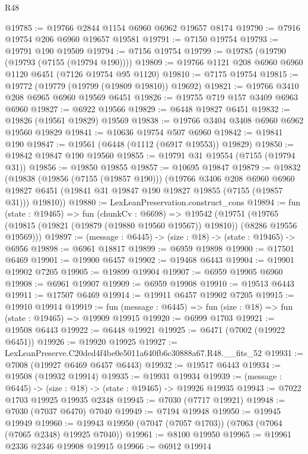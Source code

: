 \begin{lexlean}{R48}
\begin{coremodule}
@19785 := @19766 @2844 @1154 @6960 @6962 @19657 @8174
@19790 := @7916 @19754 @206 @6960 @19657 @19581
@19791 := @7150 @19754
@19793 := @19791 @190 @19509
@19794 := @7156 @19754
@19799 := @19785 (@19790 (@19793 (@7155 (@19794 @190))))
@19809 := @19766 @1121 @208 @6960 @6960 @1120 @6451 (@7126 @19754 @95 @1120)
@19810 := @7175 @19754
@19815 := @19772 (@19779 (@19799 (@19809 @19810)) @19692)
@19821 := @19766 @3410 @208 @6965 @6960 @19569 @6451
@19826 := @19755 @719 @157 @3409 @6963 @6960
@19827 := @6922 @19566
@19829 := @6448 @19827 @6451
@19832 := @19826 (@19561 @19829) @19569
@19838 := @19766 @3404 @3408 @6960 @6962 @19560 @19829
@19841 := @10636 @19754 @507 @6960
@19842 := @19841 @190
@19847 := @19561 (@6448 (@1112 (@6917 @19553)) @19829)
@19850 := @19842 @19847 @190 @19560
@19855 := @19791 @31 @19554 (@7155 (@19794 @31))
@19856 := @19850 @19855
@19857 := @10695 @19847
@19879 := @19832
    (@19838
      (@19856 (@7155 (@19857 @190)))
      (@19766
        @3406
        @208
        @6960
        @6960
        @19827
        @6451
        (@19841 @31 @19847 @190 @19827 @19855 (@7155 (@19857 @31)))
        @19810))
@19880 := LexLeanPreservation.construct_cons
@19894 := fun (state : @19465) =>
  fun (chunkCv : @6698) =>
  @19542
    (@19751 (@19765 (@19815 (@19821 (@19879 (@19880 @19560 @19567)) @19810)) (@8286 @19556 @19569)))
@19897 := (message : @6445) -> (size : @18) -> (state : @19465) -> @6956
@19898 := @6961 @18817
@19899 := @6959 @19898
@19900 := @17501 @6469
@19901 := @19900 @6457
@19902 := @19468 @6443
@19904 := @19901 @19902 @7205
@19905 := @19899 @19904
@19907 := @6959 @19905 @6960
@19908 := @6961 @19907
@19909 := @6959 @19908
@19910 := @19513 @6443
@19911 := @17507 @6469
@19914 := @19911 @6457 @19902 @7205
@19915 := @19910 @19914
@19919 := fun (message : @6445) => fun (size : @18) => fun (state : @19465) => @19909 @19915
@19920 := @6999 @1703
@19921 := @19508 @6443
@19922 := @6448 @19921
@19925 := @6471 (@7002 (@19922 @6451))
@19926 := @19920 @19925
@19927 := LexLeanPreserve.C20ded4f4be0e5011a640fb6c30888a67.R48.__fits_52
@19931 := @7008 (@19927 @6469 @6457 @6443)
@19932 := @19517 @6443
@19934 := @19508 (@19932 @19914)
@19935 := @19931 @19934
@19939 := (message : @6445) -> (size : @18) -> (state : @19465) -> @19926 @19935
@19943 := @7022 @1703 @19925 @19935 @2348
@19945 := @7030 (@7717 @19921)
@19948 := @7030 (@7037 @6470) @7040
@19949 := @7194 @19948
@19950 := @19945 @19949
@19960 := @19943 @19950 (@7047 (@7057 @1703)) (@7063 (@7064 (@7065 @2348) @19925 @7040))
@19961 := @8100 @19950
@19965 := @19961 @2336 @2346 @19908 @19915
@19966 := @6912 @19914

\end{coremodule}
\end{lexlean}
